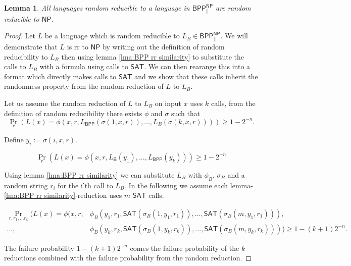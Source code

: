 \documentclass[10pt,a4paper]{article}
\newtheorem{lemma}[theorem]{Lemma}
\begin{document}
\begin{lemma}\label{lma: rr to BPP NP parallel is rr to NP}
    All languages random reducible to a language in $\mathsf{BPP^{NP}_{\parallel}}$ are random reducible to $\mathsf{NP}$.
\end{lemma}
\begin{proof}Let $L$ be a language which is random reducible to $L_B\in \mathsf{BPP^{NP}_{\parallel}}$. We will demonstrate that $L$ is rr to $\mathsf{NP}$ by writing out the definition of random reducibility to ${L_B}$ then using lemma \ref{lma:BPP rr similarity} to substitute the calls to ${L_B}$ with a formula using calls to $\mathsf{SAT}$. We can then rearange this into a format which directly makes calls to $\mathsf{SAT}$ and we show that these calls inherit the randomness property from the random reduction of $L$ to $L_B$.

    Let us assume the random reduction of $L$ to $L_B$ on input $x$ uses $k$ calls, from the definition of random reducibility there exists $\phi$ and $\sigma$ such that
    \[
\Pr_{r}\left(
            L(x)=\phi(x,r,L_{\mathsf{BPP}}(\sigma(1,x,r)),\ldots, L_{{B}}(\sigma(k, x, r)))
            \right)\geq 1-2^{-n}.
\]

Define $y_i:=\sigma(i, x, r)$. 

\[
\Pr_{r}\left(
            L(x)=\phi(x,r,L_{\mathsf{B}}(y_1),\ldots, L_{\mathsf{BPP}}(y_k))
            \right)\geq 1-2^{-n}
\]

Using lemma \ref{lma:BPP rr similarity} we can substitute $L_B$ with $\phi_B$, $\sigma_B$ and a random string $r_i$ for the i'th call to $L_B$. In the following we assume each lemma-\ref{lma:BPP rr similarity}-reduction uses $m$ $\mathsf{SAT}$ calls.

\begin{align*}
\Pr_{r, r_1, \ldots r_k}\big(
            L(x)=\phi(x,r,&\phi_{B}(y_1,r_1,\mathsf{SAT}(\sigma_{B}(1,y_1,r_1)),
            \ldots, \mathsf{SAT}(\sigma_{B}(m, y_1, r_1))),\\ \ldots, &\phi_{B}(y_k,r_k,\mathsf{SAT}(\sigma_{B}(1,y_k,r_k)), \ldots, \mathsf{SAT}(\sigma_{B}(m,y_k,r_k)))
            \big)
            \geq 1-(k+1)2^{-n}.
\end{align*}

The failure probability $1-(k+1)2^{-n}$ comes the failure probability of the $k$ reductions combined with the failure probability from the random reduction.


\end{proof}
\end{document}
